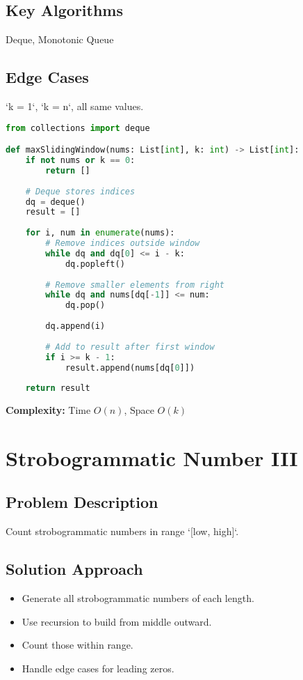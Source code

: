 \documentclass[10pt, a4paper]{article}
\begin{document}
\subsection*{Key Algorithms}
Deque, Monotonic Queue

\subsection*{Edge Cases}
`k = 1`, `k = n`, all same values.

\begin{lstlisting}[language=Python]
from collections import deque

def maxSlidingWindow(nums: List[int], k: int) -> List[int]:
    if not nums or k == 0:
        return []
    
    # Deque stores indices
    dq = deque()
    result = []
    
    for i, num in enumerate(nums):
        # Remove indices outside window
        while dq and dq[0] <= i - k:
            dq.popleft()
        
        # Remove smaller elements from right
        while dq and nums[dq[-1]] <= num:
            dq.pop()
        
        dq.append(i)
        
        # Add to result after first window
        if i >= k - 1:
            result.append(nums[dq[0]])
    
    return result
\end{lstlisting}
\textbf{Complexity:} Time $O(n)$, Space $O(k)$

\section{Strobogrammatic Number III}
\subsection*{Problem Description}
Count strobogrammatic numbers in range `[low, high]`.

\subsection*{Solution Approach}
\begin{itemize}
    \item Generate all strobogrammatic numbers of each length.
    \item Use recursion to build from middle outward.
    \item Count those within range.
    \item Handle edge cases for leading zeros.
\end{itemize}
\end{document}
